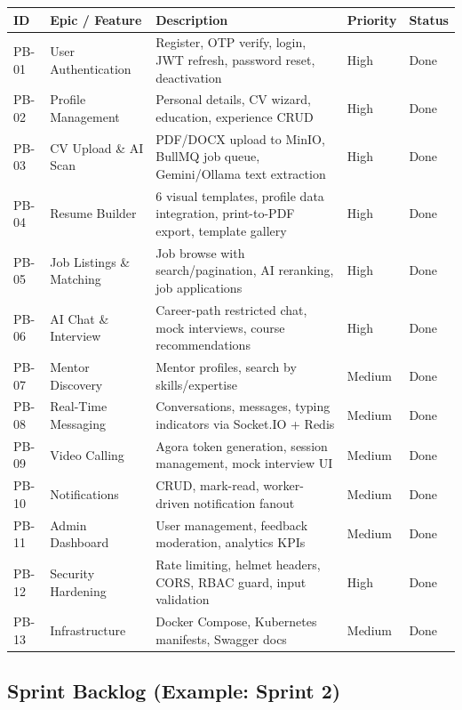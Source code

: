 \documentclass[12pt,a4paper]{report}
\begin{document}
\begin{longtable}{|p{0.8cm}|p{3.5cm}|p{3.5cm}|p{1.5cm}|p{1.5cm}|}
\hline
\textbf{ID} & \textbf{Epic / Feature} & \textbf{Description} & \textbf{Priority} & \textbf{Status} \\
\hline
PB-01 & User Authentication & Register, OTP verify, login, JWT refresh, password reset, deactivation & High & Done \\
\hline
PB-02 & Profile Management & Personal details, CV wizard, education, experience CRUD & High & Done \\
\hline
PB-03 & CV Upload \& AI Scan & PDF/DOCX upload to MinIO, BullMQ job queue, Gemini/Ollama text extraction & High & Done \\
\hline
PB-04 & Resume Builder & 6 visual templates, profile data integration, print-to-PDF export, template gallery & High & Done \\
\hline
PB-05 & Job Listings \& Matching & Job browse with search/pagination, AI reranking, job applications & High & Done \\
\hline
PB-06 & AI Chat \& Interview & Career-path restricted chat, mock interviews, course recommendations & High & Done \\
\hline
PB-07 & Mentor Discovery & Mentor profiles, search by skills/expertise & Medium & Done \\
\hline
PB-08 & Real-Time Messaging & Conversations, messages, typing indicators via Socket.IO + Redis & Medium & Done \\
\hline
PB-09 & Video Calling & Agora token generation, session management, mock interview UI & Medium & Done \\
\hline
PB-10 & Notifications & CRUD, mark-read, worker-driven notification fanout & Medium & Done \\
\hline
PB-11 & Admin Dashboard & User management, feedback moderation, analytics KPIs & Medium & Done \\
\hline
PB-12 & Security Hardening & Rate limiting, helmet headers, CORS, RBAC guard, input validation & High & Done \\
\hline
PB-13 & Infrastructure & Docker Compose, Kubernetes manifests, Swagger docs & Medium & Done \\
\hline
\end{longtable}

\subsection{Sprint Backlog (Example: Sprint 2)}
\end{document}
